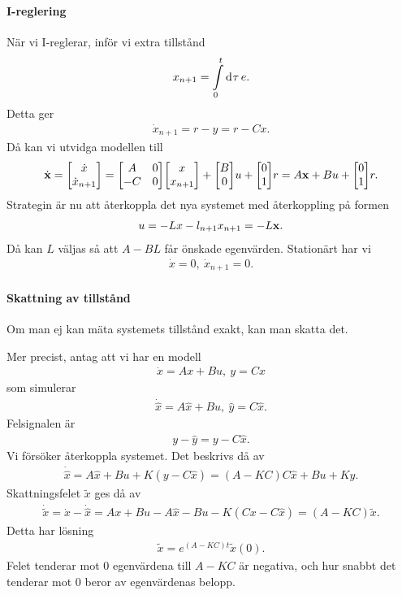 \paragraph{I-reglering}
När vi I-reglerar, inför vi extra tillstånd
\begin{align*}
	x_{n + 1} = \int\limits_{0}^{t}\dd[]{\tau}e.
\end{align*}
Detta ger
\begin{align*}
	\dot{x}_{n + 1} = r - y = r - Cx.
\end{align*}
Då kan vi utvidga modellen till
\begin{align*}
	\dot{\vb{x}} =
	\mqty[
		\dot{x} \\
		\dot{x}_{n + 1}
	]
	=
	\mqty[
		A  & 0 \\
		-C & 0
	]
	\mqty[
		x \\
		x_{n + 1}
	] +
	\mqty[
		B \\
		0
	]
	u
	+
	\mqty[
		0 \\
		1
	]
	r = A\vb{x} + Bu + 
	\mqty[
		0 \\
		1
	]
	r.
\end{align*}
Strategin är nu att återkoppla det nya systemet med återkoppling på formen
\begin{align*}
	u = -Lx - l_{n + 1}x_{n + 1} = -L\vb{x}.
\end{align*}
Då kan $L$ väljas så att $A - BL$ får önskade egenvärden. Stationärt har vi
\begin{align*}
	\dot{x} = 0,\ 	\dot{x}_{n + 1} = 0.
\end{align*}

\paragraph{Skattning av tillstånd}
Om man ej kan mäta systemets tillstånd exakt, kan man skatta det.

Mer precist, antag att vi har en modell
\begin{align*}
	\dot{x} = Ax + Bu,\ y = Cx
\end{align*}
som simulerar
\begin{align*}
	\dot{\hat{x}} = A\hat{x} + Bu,\  \hat{y} = C\hat{x}.
\end{align*}
Felsignalen är
\begin{align*}
	y - \hat{y} = y - C\hat{x}.
\end{align*}
Vi försöker återkoppla systemet. Det beskrivs då av
\begin{align*}
	\dot{\hat{x}} = A\hat{x} + Bu + K(y- C\hat{x}) = (A - KC)C\hat{x} + Bu + Ky.
\end{align*}
Skattningsfelet $\tilde{x}$ ges då av
\begin{align*}
	\dot{\tilde{x}} = \dot{x} - \dot{\hat{x}} = Ax + Bu - A\hat{x} - Bu - K(Cx - C\hat{x}) = (A - KC)\tilde{x}.
\end{align*}
Detta har lösning
\begin{align*}
	\tilde{x} = e^{(A - KC)t}\tilde{x}(0).
\end{align*}
Felet tenderar mot $0$ egenvärdena till $A - KC$ är negativa, och hur snabbt det tenderar mot $0$ beror av egenvärdenas belopp.

